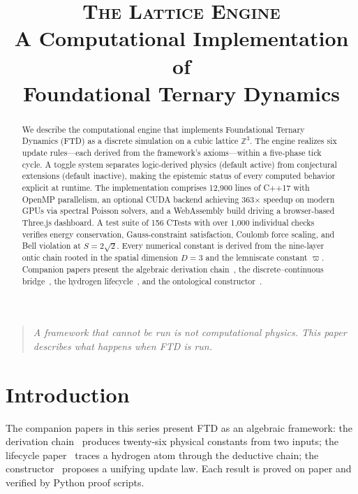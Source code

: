 \documentclass[11pt,a4paper]{article}
\title{\textsc{The Lattice Engine}\\[6pt]
\large A Computational Implementation of\\
Foundational Ternary Dynamics}
\author{}
\date{}
\newcommand{\vpi}{\varpi}
\newcommand{\ZZ}{\mathbb{Z}}
\theoremstyle{compact}
\begin{document}
\maketitle
\thispagestyle{empty}

\begin{abstract}
\noindent We describe the computational engine that implements Foundational Ternary Dynamics (FTD) as a discrete simulation on a cubic lattice $\ZZ^3$. The engine realizes six update rules---each derived from the framework's axioms---within a five-phase tick cycle. A toggle system separates logic-derived physics (default active) from conjectural extensions (default inactive), making the epistemic status of every computed behavior explicit at runtime. The implementation comprises 12,900 lines of C++17 with OpenMP parallelism, an optional CUDA backend achieving 363$\times$ speedup on modern GPUs via spectral Poisson solvers, and a WebAssembly build driving a browser-based Three.js dashboard. A test suite of 156 CTests with over 1,000 individual checks verifies energy conservation, Gauss-constraint satisfaction, Coulomb force scaling, and Bell violation at $S = 2\sqrt{2}$. Every numerical constant is derived from the nine-layer ontic chain rooted in the spatial dimension $D = 3$ and the lemniscate constant $\vpi$. Companion papers present the algebraic derivation chain~\cite{chain}, the discrete--continuous bridge~\cite{bridge}, the hydrogen lifecycle~\cite{lifecycle}, and the ontological constructor~\cite{constructor}.
\end{abstract}

\smallskip

\begin{quote}\itshape
A framework that cannot be run is not computational physics. This paper describes what happens when FTD is run.
\end{quote}


\section{Introduction}
\label{sec:intro}

The companion papers in this series present FTD as an algebraic framework: the derivation chain~\cite{chain} produces twenty-six physical constants from two inputs; the lifecycle paper~\cite{lifecycle} traces a hydrogen atom through the deductive chain; the constructor~\cite{constructor} proposes a unifying update law. Each result is proved on paper and verified by Python proof scripts.
\end{document}
